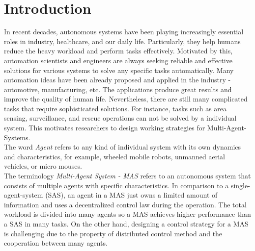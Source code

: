 
\chapter{Introduction}\label{chapter:intro}
In recent decades, autonomous systems have been playing increasingly essential roles in industry, healthcare, and our daily life. Particularly, they help humans reduce the heavy workload and perform tasks effectively. Motivated by this, automation scientists and engineers are always seeking reliable and effective solutions for various systems to solve any specific tasks automatically. Many automation ideas have been already proposed and applied in the industry - automotive, manufacturing, etc. The applications produce great results and improve the quality of human life. Nevertheless, there are still many complicated tasks that require sophisticated solutions. For instance, tasks such as area sensing, surveillance, and rescue operations can not be solved by a individual system. This motivates researchers to design working strategies for Multi-Agent-Systems.\\
\noindent The word \textit{Agent} refers to any kind of individual system with its own dynamics and characteristics, for example, wheeled mobile robots, unmanned aerial vehicles, or micro mouses. \\
\noindent The terminology \textit{Multi-Agent System - MAS} refers to an autonomous system that consists of multiple agents with specific characteristics. In comparison to a single-agent-system (SAS), an agent in a MAS just owns a limited amount of information and uses a decentralized control law during the operation. The total workload is divided into many agents so a MAS achieves higher performance than a SAS in many tasks. On the other hand, designing a control strategy for a MAS is challenging due to the property of distributed control method and the cooperation between many agents.\\
